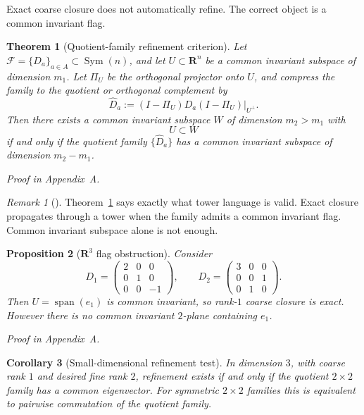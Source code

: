 \documentclass[11pt,a4paper]{article}
\numberwithin{equation}{section}
\DeclareMathOperator{\Sym}{Sym}
\DeclareMathOperator{\spanop}{span}
\newcommand{\R}{\mathbf R}
\theoremstyle{thmcompact}
\newtheorem{theorem}{Theorem}[section]
\newtheorem{proposition}[theorem]{Proposition}
\newtheorem{corollary}[theorem]{Corollary}
\theoremstyle{remark}
\newtheorem*{remarkplain}{Remark}
\newenvironment{remark}[1][]%
{\begin{remarkbox}\begin{remarkplain}[#1]\normalfont}
{\end{remarkplain}\end{remarkbox}}
\newcommand{\proofappendix}{\par{\hfill\scriptsize\emph{Proof in Appendix~A.}}\par}
\begin{document}
Exact coarse closure does not automatically refine. The correct object is a common invariant flag.

\begin{theorem}[Quotient-family refinement criterion]
\label{thm:refinement-criterion}
Let $\mathcal F=\{D_a\}_{a\in A}\subset\Sym(n)$, and let $U\subset\R^n$ be a common invariant subspace of dimension $m_1$. Let $\Pi_U$ be the orthogonal projector onto $U$, and compress the family to the quotient or orthogonal complement by
\begin{equation}
\widehat D_a:=(I-\Pi_U)D_a(I-\Pi_U)\big|_{U^{\perp}}.
\label{eq:quotient-family}
\end{equation}
Then there exists a common invariant subspace $W$ of dimension $m_2>m_1$ with
\begin{equation}
U\subset W
\label{eq:flag-inclusion}
\end{equation}
if and only if the quotient family $\{\widehat D_a\}$ has a common invariant subspace of dimension $m_2-m_1$.
\end{theorem}

\proofappendix

\begin{remark}
Theorem~\ref{thm:refinement-criterion} says exactly what tower language is valid. Exact closure propagates through a tower when the family admits a common invariant flag. Common invariant subspace alone is not enough.
\end{remark}

\begin{proposition}[$\R^3$ flag obstruction]
\label{prop:R3-obstruction}
Consider
\begin{equation}
D_1=
\begin{pmatrix}
2&0&0\\
0&1&0\\
0&0&-1
\end{pmatrix},
\qquad
D_2=
\begin{pmatrix}
3&0&0\\
0&0&1\\
0&1&0
\end{pmatrix}.
\label{eq:R3-example}
\end{equation}
Then $U=\spanop(e_1)$ is common invariant, so rank-$1$ coarse closure is exact. However there is no common invariant $2$-plane containing $e_1$.
\end{proposition}

\proofappendix

\begin{corollary}[Small-dimensional refinement test]
\label{cor:small-dim-refinement}
In dimension $3$, with coarse rank $1$ and desired fine rank $2$, refinement exists if and only if the quotient $2\times 2$ family has a common eigenvector. For symmetric $2\times 2$ families this is equivalent to pairwise commutation of the quotient family.
\end{corollary}
\end{document}
